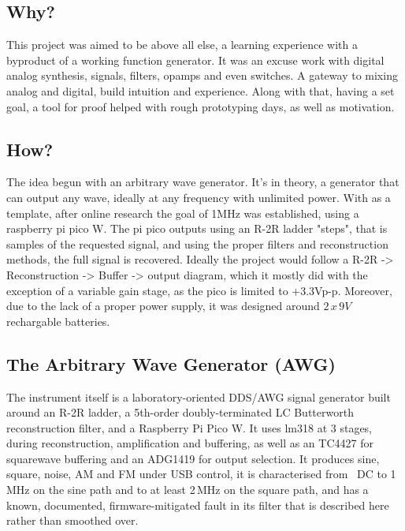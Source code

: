 \documentclass[11pt,a4paper]{article}
\begin{document}
\begin{callout}[title={Why? How?}]
    \subsection{Why?}
    This project was aimed to be above all else, a learning experience with a byproduct of a working function generator. It was an excuse
    work with digital analog synthesis, signals, filters, opamps and even switches. A gateway to mixing analog and digital, build intuition
    and experience. Along with that, having a set goal, a tool for proof helped with rough prototyping days, as well as motivation.

    \subsection{How?}
    The idea begun with an arbitrary wave generator. It's in theory, a generator that can output any wave, ideally at any frequency with unlimited power.
    With as a template, after online research the goal of 1MHz was established, using a raspberry pi pico W. The pi pico outputs using an R-2R ladder "steps",
    that is samples of the requested signal, and using the proper filters and reconstruction methods, the full signal is recovered. Ideally the project would
    follow a R-2R -> Reconstruction -> Buffer -> output diagram, which it mostly did with the exception of a variable gain stage, as the pico is limited
    to +3.3Vp-p. Moreover, due to the lack of a proper power supply, it was designed around $2\,x\,9V$ rechargable batteries.

    \subsection{The Arbitrary Wave Generator (AWG)}
    The instrument itself is a laboratory-oriented DDS/AWG signal generator built around an
    R-2R ladder, a 5th-order doubly-terminated LC Butterworth reconstruction filter, and a
    Raspberry Pi Pico W. It uses lm318 at 3 stages, during reconstruction, amplification and buffering, as
    well as an TC4427 for squarewave buffering and an ADG1419 for output selection.
    It produces sine, square, noise, AM and FM under USB control, it is
    characterised from ~DC to 1\,MHz on the sine path and to at least 2\,MHz on the square
    path, and has a known, documented, firmware-mitigated fault in its filter that is
    described here rather than smoothed over.

\end{callout}
\end{document}
